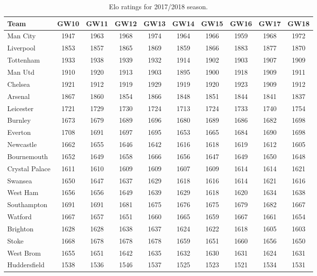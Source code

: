 \begin{table}[H]
\centering
\smaller
\begin{tabular}{|l|c|c|c|c|c|c|c|c|c|}
\hline
Team           & GW10 & GW11 & GW12 & GW13 & GW14 & GW15 & GW16 & GW17 & GW18 \\
\hline
Man City       & 1947 & 1963 & 1968 & 1974 & 1964 & 1966 & 1959 & 1968 & 1972 \\
Liverpool      & 1853 & 1857 & 1865 & 1869 & 1859 & 1866 & 1883 & 1877 & 1870 \\
Tottenham      & 1933 & 1938 & 1939 & 1932 & 1914 & 1902 & 1903 & 1907 & 1909 \\
Man Utd        & 1910 & 1920 & 1913 & 1903 & 1895 & 1900 & 1918 & 1909 & 1911 \\
Chelsea        & 1921 & 1912 & 1919 & 1929 & 1919 & 1920 & 1923 & 1909 & 1912 \\
Arsenal        & 1867 & 1860 & 1854 & 1866 & 1848 & 1851 & 1844 & 1841 & 1837 \\
Leicester      & 1721 & 1729 & 1730 & 1724 & 1713 & 1724 & 1733 & 1740 & 1754 \\
Burnley        & 1673 & 1679 & 1689 & 1696 & 1680 & 1689 & 1686 & 1682 & 1698 \\
Everton        & 1708 & 1691 & 1697 & 1695 & 1653 & 1665 & 1684 & 1690 & 1698 \\
Newcastle      & 1662 & 1655 & 1646 & 1642 & 1616 & 1618 & 1619 & 1612 & 1605 \\
Bournemouth    & 1652 & 1649 & 1658 & 1666 & 1656 & 1647 & 1649 & 1650 & 1648 \\
Crystal Palace & 1611 & 1610 & 1609 & 1609 & 1607 & 1609 & 1614 & 1614 & 1621 \\
Swansea        & 1650 & 1647 & 1637 & 1629 & 1618 & 1616 & 1614 & 1621 & 1616 \\
West Ham       & 1656 & 1656 & 1649 & 1639 & 1629 & 1618 & 1620 & 1634 & 1638 \\
Southampton    & 1691 & 1691 & 1681 & 1675 & 1676 & 1675 & 1679 & 1682 & 1667 \\
Watford        & 1667 & 1657 & 1651 & 1660 & 1665 & 1659 & 1667 & 1661 & 1654 \\
Brighton       & 1628 & 1628 & 1638 & 1637 & 1624 & 1622 & 1618 & 1605 & 1603 \\
Stoke          & 1668 & 1678 & 1678 & 1678 & 1659 & 1651 & 1660 & 1656 & 1650 \\
West Brom      & 1655 & 1651 & 1642 & 1635 & 1632 & 1630 & 1631 & 1624 & 1631 \\
Huddersfield   & 1538 & 1536 & 1546 & 1537 & 1525 & 1523 & 1521 & 1534 & 1531 \\
\hline
\end{tabular}
\caption{Elo ratings for 2017/2018 season.}
\label{tab:elo_values_gameweeks_2}
\end{table}


